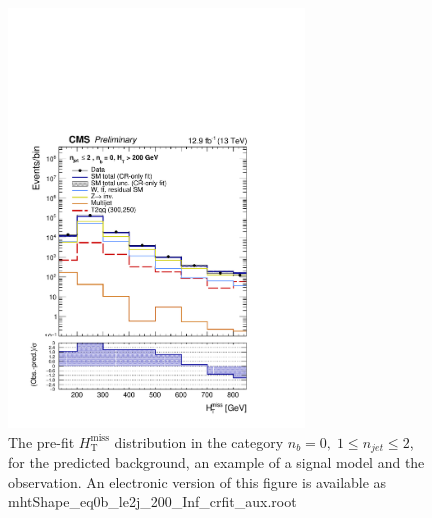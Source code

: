 \clearpage



\clearpage



\clearpage



\clearpage




\clearpage
\begin{figure}[tbhp]
    \caption{ 
    The pre-fit $H_{\mathrm{T}}^{\mathrm{miss}}$ distribution in the category $n_{b}=0, \; 1 \leq n_{jet} \leq 2$, 
    for the predicted background, an example of a signal model and the observation.
    An electronic version of this figure is available as mhtShape\_eq0b\_le2j\_200\_Inf\_crfit\_aux.root
    \label{fig:mhtShape_eq0b_le2j_crfit} }
  \begin{center}
  \includegraphics[width=0.7\textwidth]{mhtShape_eq0b_le2j_200_Inf_crfit_aux}
  \end{center}
\end{figure}

